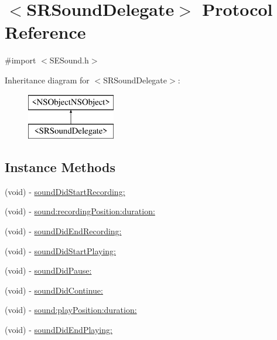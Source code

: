 \hypertarget{protocol_s_r_sound_delegate-p}{\section{$<$S\-R\-Sound\-Delegate$>$ Protocol Reference}
\label{protocol_s_r_sound_delegate-p}
}


{\ttfamily \#import $<$S\-E\-Sound.\-h$>$}

Inheritance diagram for $<$S\-R\-Sound\-Delegate$>$\-:\begin{figure}[H]
\begin{center}
\leavevmode
\includegraphics[height=2.000000cm]{protocol_s_r_sound_delegate-p}
\end{center}
\end{figure}
\subsection*{Instance Methods}
\begin{DoxyCompactItemize}
\item 
(void) -\/ \hyperlink{protocol_s_r_sound_delegate-p_a898e906bd01c0aee0414d71f4d8dac5f}{sound\-Did\-Start\-Recording\-:}
\item 
(void) -\/ \hyperlink{protocol_s_r_sound_delegate-p_ab925ae685ece0f33d52eeae00967fc82}{sound\-:recording\-Position\-:duration\-:}
\item 
(void) -\/ \hyperlink{protocol_s_r_sound_delegate-p_a67386038ed9120f038886468e0f402fd}{sound\-Did\-End\-Recording\-:}
\item 
(void) -\/ \hyperlink{protocol_s_r_sound_delegate-p_a24902ad7f60f0030456b4849c683133f}{sound\-Did\-Start\-Playing\-:}
\item 
(void) -\/ \hyperlink{protocol_s_r_sound_delegate-p_a167409cbe5f854e0d0655ae1f9923796}{sound\-Did\-Pause\-:}
\item 
(void) -\/ \hyperlink{protocol_s_r_sound_delegate-p_a0fabf98bbb520f679752f7abdaff5d5d}{sound\-Did\-Continue\-:}
\item 
(void) -\/ \hyperlink{protocol_s_r_sound_delegate-p_a42f4fb9b987e034231c0ef2e7eb229c6}{sound\-:play\-Position\-:duration\-:}
\item 
(void) -\/ \hyperlink{protocol_s_r_sound_delegate-p_a57789e91813d3e7a39b7d110404a3783}{sound\-Did\-End\-Playing\-:}
\end{DoxyCompactItemize}


